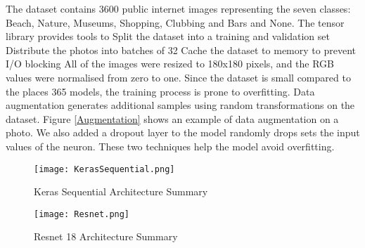The dataset contains 3600 public internet images
representing the seven classes: Beach, Nature,
Museums, Shopping, Clubbing and Bars and None. The
tensor library provides tools to Split the dataset
into a training and validation set Distribute the
photos into batches of 32 Cache the dataset to memory
to prevent I/O blocking All of the images were resized
to 180x180 pixels, and the RGB values were normalised
from zero to one.  	Since the dataset is small
compared to the places 365 models, the training
process is prone to overfitting. Data augmentation
generates additional samples using random
transformations on the dataset. Figure \ref{Augmentation} shows an
example of data augmentation on a photo. We also added
a dropout layer to the model randomly drops sets the
input values of the neuron. These two techniques help
the model avoid overfitting.


\begin{figure}[H]
  \centering
  \begin{minipage}[b]{0.3\textwidth}
    \texttt{[image: KerasSequential.png]}
    \caption{Keras Sequential Architecture Summary}
    \label{Keras}
  \end{minipage}
  \hfill
  \begin{minipage}[b]{0.3\textwidth}
\texttt{[image: Resnet.png]}
\caption{Resnet 18 Architecture Summary}
\label{Resnet}
  \end{minipage}
\end{figure}

